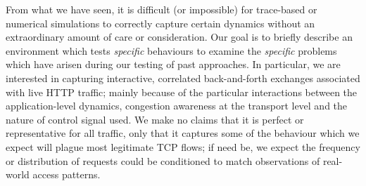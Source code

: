 \documentclass[conference, letterpaper, 10pt, times]{IEEEtran}
\begin{document}
From what we have seen, it is difficult (or impossible) for trace-based or numerical simulations to correctly capture certain dynamics without an extraordinary amount of care or consideration.
Our goal is to briefly describe an environment which tests \emph{specific} behaviours to examine the \emph{specific} problems which have arisen during our testing of past approaches.
In particular, we are interested in capturing interactive, correlated back-and-forth exchanges associated with live HTTP traffic; mainly because of the particular interactions between the application-level dynamics, congestion awareness at the transport level and the nature of control signal used.
We make no claims that it is perfect or representative for all traffic, only that it captures some of the behaviour which we expect will plague most legitimate TCP flows; if need be, we expect the frequency or distribution of requests could be conditioned to match observations of real-world access patterns.



\end{document}
